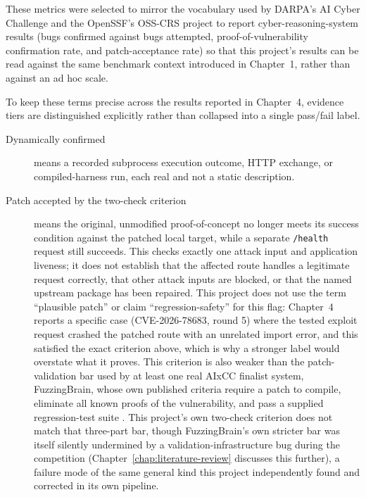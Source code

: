 \documentclass[12pt,a4paper]{report}
\begin{document}
These metrics were selected to mirror the vocabulary used by DARPA's AI Cyber Challenge and the OpenSSF's OSS-CRS project to report cyber-reasoning-system results (bugs confirmed against bugs attempted, proof-of-vulnerability confirmation rate, and patch-acceptance rate) so that this project's results can be read against the same benchmark context introduced in Chapter~1, rather than against an ad hoc scale.

To keep these terms precise across the results reported in Chapter~4, evidence tiers are distinguished explicitly rather than collapsed into a single pass/fail label.

\begin{description}
\item[Dynamically confirmed] means a recorded subprocess execution outcome, HTTP exchange, or compiled-harness run, each real and not a static description.

\item[Patch accepted by the two-check criterion] means the original, unmodified proof-of-concept no longer meets its success condition against the patched local target, while a separate \texttt{/health} request still succeeds. This checks exactly one attack input and application liveness; it does not establish that the affected route handles a legitimate request correctly, that other attack inputs are blocked, or that the named upstream package has been repaired. This project does not use the term ``plausible patch'' or claim ``regression-safety'' for this flag: Chapter~4 reports a specific case (CVE-2026-78683, round 5) where the tested exploit request crashed the patched route with an unrelated import error, and this satisfied the exact criterion above, which is why a stronger label would overstate what it proves. This criterion is also weaker than the patch-validation bar used by at least one real AIxCC finalist system, FuzzingBrain, whose own published criteria require a patch to compile, eliminate all known proofs of the vulnerability, and pass a supplied regression-test suite \cite{fuzzingbrain}. This project's own two-check criterion does not match that three-part bar, though FuzzingBrain's own stricter bar was itself silently undermined by a validation-infrastructure bug during the competition (Chapter~\ref{chap:literature-review} discusses this further), a failure mode of the same general kind this project independently found and corrected in its own pipeline.


\end{description}
\end{document}
